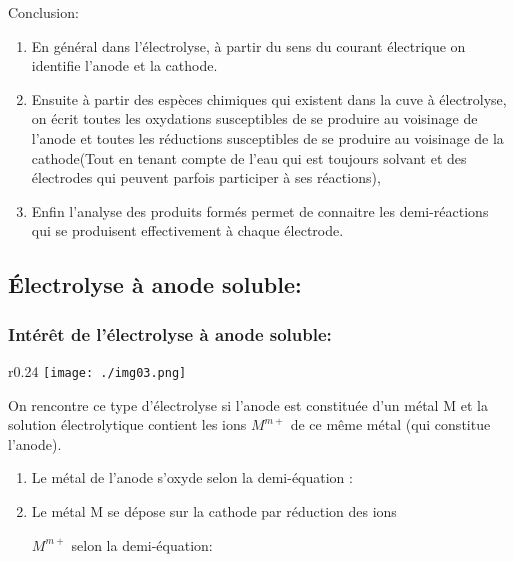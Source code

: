 \documentclass[12pt]{article}
\begin{document}
\begin{tcolorbox}
Conclusion:
\begin{enumerate}
	\item En général dans l'électrolyse, à partir du sens du courant électrique on identifie l'anode et la cathode.

	\item Ensuite à partir des espèces chimiques qui existent dans la cuve à électrolyse, on écrit toutes les oxydations susceptibles de se
produire au voisinage de l'anode et toutes les réductions susceptibles de se produire au voisinage de la cathode(Tout en tenant
compte de l'eau qui est toujours solvant et des électrodes qui peuvent parfois participer à ses réactions),
\item Enfin l'analyse des produits formés permet de connaitre les demi-réactions qui se produisent effectivement à chaque électrode.
\end{enumerate}
\end{tcolorbox}

\subsection{Électrolyse à anode soluble:}
\subsubsection{Intérêt de l’électrolyse à anode soluble:}

\begin{wrapfigure}[1]{r}{0.24\textwidth}
	\vspace{-3.5cm}
	\texttt{[image: ./img03.png]}
\end{wrapfigure}

On rencontre ce type d'électrolyse si l'anode est constituée d'un métal M et la solution électrolytique contient les
ions $M^{m+}$ de ce même métal (qui constitue l'anode).

\begin{enumerate}

	\item Le métal de l'anode s'oxyde selon la demi-équation : 

	\item Le métal M se dépose sur la cathode par réduction des ions 

		$M^{m+}$ selon la demi-équation:

\end{enumerate}
\end{document}
